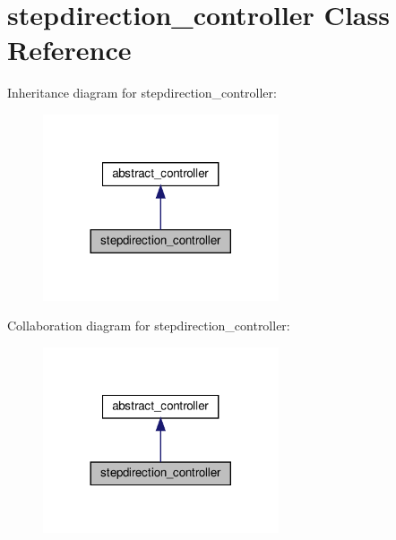 \hypertarget{classstepdirection__controller}{}\section{stepdirection\+\_\+controller Class Reference}
\label{classstepdirection__controller}


Inheritance diagram for stepdirection\+\_\+controller\+:\nopagebreak
\begin{figure}[H]
\begin{center}
\leavevmode
\includegraphics[width=197pt]{classstepdirection__controller__inherit__graph}
\end{center}
\end{figure}


Collaboration diagram for stepdirection\+\_\+controller\+:\nopagebreak
\begin{figure}[H]
\begin{center}
\leavevmode
\includegraphics[width=197pt]{classstepdirection__controller__coll__graph}
\end{center}
\end{figure}
